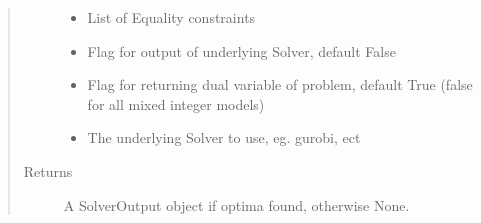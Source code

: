 \documentclass[letterpaper,10pt,english]{sphinxmanual}
\begin{document}
\begin{fulllineitems}
\begin{quote}
\begin{description}
\begin{itemize}
\item {} 
\sphinxAtStartPar
{} \textendash{} List of Equality constraints

\item {} 
\sphinxAtStartPar
{} \textendash{} Flag for output of underlying Solver, default False

\item {} 
\sphinxAtStartPar
{} \textendash{} Flag for returning dual variable of problem, default True (false for all mixed integer models)

\item {} 
\sphinxAtStartPar
{} \textendash{} The underlying Solver to use, eg. gurobi, ect

\end{itemize}

\item[{Returns}] \leavevmode
\sphinxAtStartPar
A SolverOutput object if optima found, otherwise None.

\end{description}\end{quote}

\end{fulllineitems}

\end{document}
